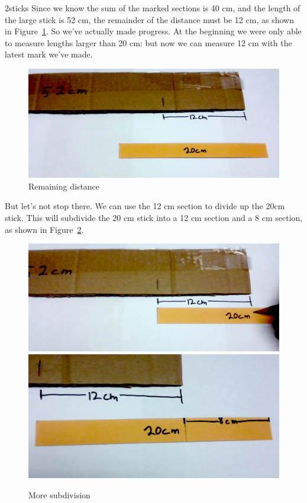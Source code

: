\begin{example}{2sticks}
Since we know the sum of the marked sections is 40 cm, and the length of the large stick is 52 cm, the remainder of the distance must be 12 cm, as shown in Figure~\ref{fig:4}. So we've actually made progress. At the beginning we were only able to measure lengths larger than 20 cm: but now we can measure 12 cm with the latest mark we've made.
\begin{figure}
\begin{center}
	\includegraphics[width=1.00\textwidth]{images/2_sticks_step5.png}
\end{center}
\caption{Remaining distance\label{fig:4}}
\end{figure}

But let's not stop there. We can use the 12 cm section to divide up the 20cm stick. This will subdivide the 20 cm stick into a 12 cm section and a 8 cm section, as shown in Figure~\ref{fig:5}.
\begin{figure}
\begin{center}
	\includegraphics[width=.4900\textwidth]{images/2_sticks_step6.png} 
\includegraphics[width=.4900\textwidth]{images/2_sticks_step7.png}
\end{center}
\caption{More subdivision\label{fig:5}}
\end{figure}


\end{example}
